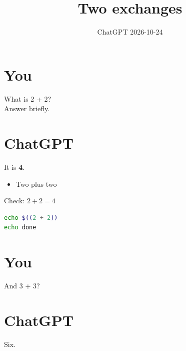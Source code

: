 \documentclass[11pt,a4paper]{article}
\title{Two exchanges}
\date{ChatGPT \textperiodcentered{} 2026-10-24}
\begin{document}
\maketitle

\section*{You}

What is 2 + 2?\\
Answer briefly.


\section*{ChatGPT}

It is \textbf{4}.

\begin{itemize}
  \item Two plus two
\end{itemize}

Check: $2+2=4$

\begin{lstlisting}[language=bash]
echo $((2 + 2))
echo done
\end{lstlisting}


\section*{You}

And 3 + 3?


\section*{ChatGPT}

Six.
\end{document}
